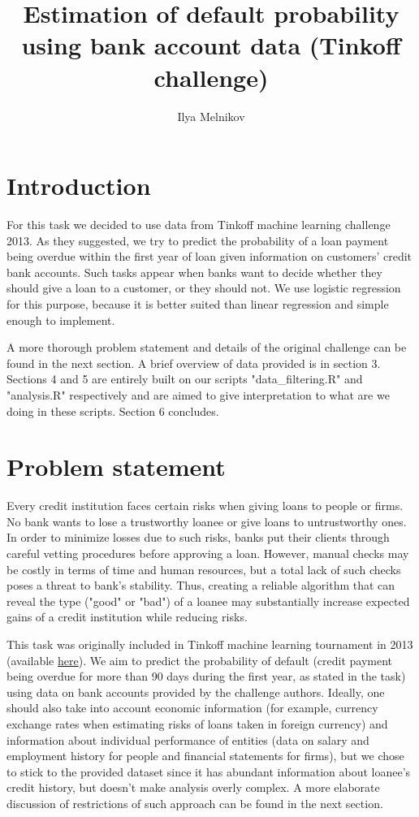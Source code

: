 \documentclass[12pt,a4paper]{article}
\author{Ilya Melnikov}
\title{Estimation of default probability using bank account data (Tinkoff challenge)}
\date{}
\begin{document}



\maketitle
\section{Introduction}

For this task we decided to use data from Tinkoff machine learning challenge 2013. As they suggested, we try to predict the probability of a loan payment being overdue within the first year of loan given information on customers' credit bank accounts. Such tasks appear when banks want to decide whether they should give a loan to a customer, or they should not. We use logistic regression for this purpose, because it is better suited than linear regression and simple enough to implement. 

A more thorough problem statement and details of the original challenge can be found in the next section. A brief overview of data provided is in section 3. Sections 4 and 5 are entirely built on our scripts "data\_filtering.R" and "analysis.R" respectively and are aimed to give interpretation to what are we doing in these scripts. Section 6 concludes.
\section{Problem statement}
Every credit institution faces certain risks when giving loans to people or firms. No bank wants to lose a trustworthy loanee or give loans to untrustworthy ones. In order to minimize losses due to such risks, banks put their clients through careful vetting procedures before approving a loan. However, manual checks may be costly in terms of time and human resources, but a total lack of such checks poses a threat to bank's stability. Thus, creating a reliable algorithm that can reveal the type ("good" or "bad") of a loanee may substantially increase expected gains of a credit institution while reducing risks.

This task was originally included in Tinkoff machine learning tournament in 2013 (available \href{https://www.tinkoff.ru/tournament/}{here}). We aim to predict the probability of default (credit payment being overdue for more than 90 days during the first year, as stated in the task) using data on bank accounts provided by the challenge authors. Ideally, one should also take into account economic information (for example, currency exchange rates when estimating risks of loans taken in foreign currency) and information about individual performance of entities (data on salary and employment history for people and financial statements for firms), but we chose to stick to the provided dataset since it has abundant information about loanee's credit history, but doesn't make analysis overly complex. A more elaborate discussion of restrictions of such approach can be found in the next section.
\end{document}
